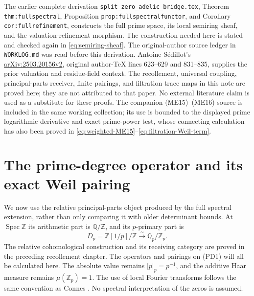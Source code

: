 \documentclass[11pt,a4paper]{article}
\theoremstyle{definition}\newtheorem{definition}[theorem]{Definition}
\newcommand{\Z}{\mathbb Z}\newcommand{\Q}{\mathbb Q}
\newcommand{\Spec}{\operatorname{Spec}}\newcommand{\SpecMon}{\operatorname{Spec}_{\mathrm{mon}}}
\begin{document}
The earlier complete derivation
\texttt{split\_zero\_adelic\_bridge.tex}, Theorem
\texttt{thm:fullspectral}, Proposition
\texttt{prop:fullspectralfunctor}, and Corollary
\texttt{cor:fullrefinement}, constructs the full prime space, its local
semiring sheaf, and the valuation-refinement morphism. The construction
needed here is stated and checked again in
\eqref{eq:semiring-sheaf}. The original-author source ledger in
\texttt{WORKLOG.md} was read before this derivation. Antoine S\'edillot's
\href{https://arxiv.org/abs/2503.20156v2}{arXiv:2503.20156v2}, original
author-TeX lines 623--629 and 831--835, supplies the prior valuation
and residue-field context. The recollement, universal coupling,
principal-parts receiver, finite pairings, and filtration trace maps
in this note are proved here; they are not attributed to that paper.
No external literature claim is used as a substitute for these proofs.
The companion (ME15)--(ME16) source is included in the same working
collection; its use is bounded to the displayed prime logarithmic
derivative and exact prime-power test, whose connecting calculation
has also been proved in \eqref{eq:weighted-ME15}--\eqref{eq:filtration-Weil-term}.


\section{The prime-degree operator and its exact Weil pairing}
\label{sec:relative-prime-degree}
We now use the relative principal-parts object produced by the full
spectral extension, rather than only comparing it with older determinant
bounds. At $\Spec\Z$ its arithmetic part is $\Q/\Z$, and its $p$-primary
part is
\[
 D_p=\Z[1/p]/\Z\xrightarrow{\ \sim\ }\Q_p/\Z_p.
 \tag{PD1}
\]
The relative cohomological construction and its receiving category are
proved in the preceding recollement chapter. The operators and pairings
on (PD1) will all be calculated here. The absolute value remains
$|p|_p=p^{-1}$, and the additive Haar measure remains $\mu(\Z_p)=1$.
The use of local Fourier transforms follows the same convention as
Connes \cite[Section III]{Connes1998}. No spectral interpretation of the
zeros is assumed.
\end{document}
